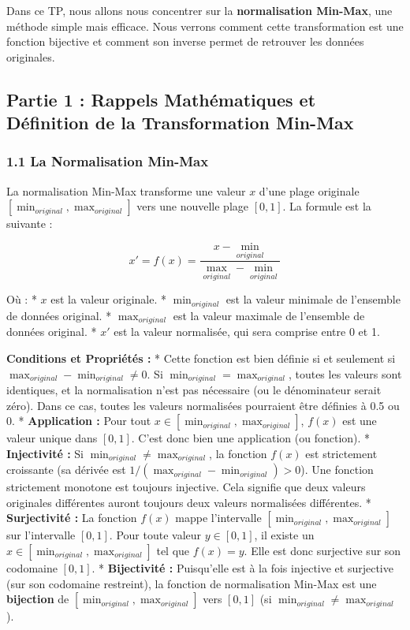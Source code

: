 \documentclass[12pt,a4paper]{report}
\begin{document}
Dans ce TP, nous allons nous concentrer sur la \textbf{normalisation
Min-Max}, une méthode simple mais efficace. Nous verrons comment cette
transformation est une fonction bijective et comment son inverse permet
de retrouver les données originales.

\subsection{Partie 1 : Rappels Mathématiques et Définition de la
Transformation
Min-Max}\label{partie-1-rappels-mathuxe9matiques-et-duxe9finition-de-la-transformation-min-max}

\subsubsection{1.1 La Normalisation
Min-Max}\label{la-normalisation-min-max}

La normalisation Min-Max transforme une valeur \(x\) d'une plage
originale \([\min_{original}, \max_{original}]\) vers une nouvelle plage
\([0, 1]\). La formule est la suivante :

\[ x' = f(x) = \frac{x - \min_{original}}{\max_{original} - \min_{original}} \]

Où : * \(x\) est la valeur originale. * \(\min_{original}\) est la
valeur minimale de l'ensemble de données original. * \(\max_{original}\)
est la valeur maximale de l'ensemble de données original. * \(x'\) est
la valeur normalisée, qui sera comprise entre 0 et 1.

\textbf{Conditions et Propriétés :} * Cette fonction est bien définie si
et seulement si \(\max_{original} - \min_{original} \neq 0\). Si
\(\min_{original} = \max_{original}\), toutes les valeurs sont
identiques, et la normalisation n'est pas nécessaire (ou le dénominateur
serait zéro). Dans ce cas, toutes les valeurs normalisées pourraient
être définies à 0.5 ou 0. * \textbf{Application :} Pour tout
\(x \in [\min_{original}, \max_{original}]\), \(f(x)\) est une valeur
unique dans \([0, 1]\). C'est donc bien une application (ou fonction). *
\textbf{Injectivité :} Si \(\min_{original} \neq \max_{original}\), la
fonction \(f(x)\) est strictement croissante (sa dérivée est
\(1 / (\max_{original} - \min_{original}) > 0\)). Une fonction
strictement monotone est toujours injective. Cela signifie que deux
valeurs originales différentes auront toujours deux valeurs normalisées
différentes. * \textbf{Surjectivité :} La fonction \(f(x)\) mappe
l'intervalle \([\min_{original}, \max_{original}]\) sur l'intervalle
\([0, 1]\). Pour toute valeur \(y \in [0, 1]\), il existe un
\(x \in [\min_{original}, \max_{original}]\) tel que \(f(x) = y\). Elle
est donc surjective sur son codomaine \([0, 1]\). * \textbf{Bijectivité
:} Puisqu'elle est à la fois injective et surjective (sur son codomaine
restreint), la fonction de normalisation Min-Max est une
\textbf{bijection} de \([\min_{original}, \max_{original}]\) vers
\([0, 1]\) (si \(\min_{original} \neq \max_{original}\)).
\end{document}
